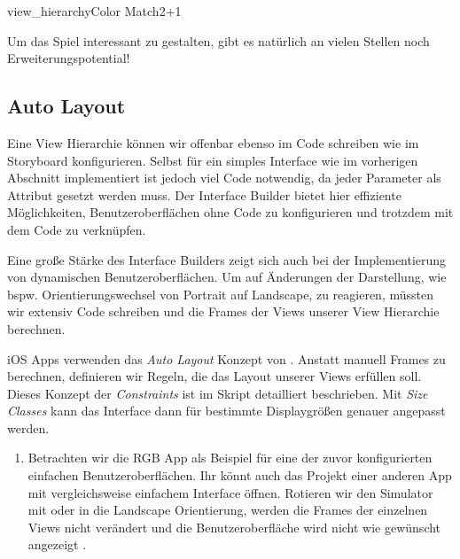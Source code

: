 \documentclass[parskip=half, final]{scrreprt}
\begin{document}
\begin{lecture}
\begin{exc}
\begin{excitem}{view_hierarchy}{Color Match}{2+1}
\begin{description}
	Um das Spiel interessant zu gestalten, gibt es natürlich an vielen Stellen noch Erweiterungspotential!

\end{description}

\end{excitem}

\end{exc}


\end{lecture}



\begin{lecture}


\section{Auto Layout}

\mvcindicatorview

Eine View Hierarchie können wir offenbar ebenso im Code schreiben wie im Storyboard konfigurieren. Selbst für ein simples Interface wie im vorherigen Abschnitt implementiert ist jedoch viel Code notwendig, da jeder Parameter als Attribut gesetzt werden muss. Der Interface Builder bietet hier effiziente Möglichkeiten, Benutzeroberflächen ohne Code zu konfigurieren und trotzdem mit dem Code zu verknüpfen.

Eine große Stärke des Interface Builders zeigt sich auch bei der Implementierung von dynamischen Benutzeroberflächen. Um auf Änderungen der Darstellung, wie bspw. Orientierungswechsel von Portrait auf Landscape, zu reagieren, müssten wir extensiv Code schreiben und die Frames der Views unserer View Hierarchie berechnen.

iOS Apps verwenden das \emph{Auto Layout} Konzept von . Anstatt manuell Frames zu berechnen, definieren wir Regeln, die das Layout unserer Views erfüllen soll. Dieses Konzept der \emph{Constraints} ist im Skript detailliert beschrieben. Mit \emph{Size Classes} kann das Interface dann für bestimmte Displaygrößen genauer angepasst werden.


\begin{enumerate}

\item Betrachten wir die RGB App als Beispiel für eine der zuvor konfigurierten einfachen Benutzeroberflächen. Ihr könnt auch das Projekt einer anderen App mit vergleichsweise einfachem Interface öffnen. Rotieren wir den Simulator mit \keys{\cmd+\arrowkeyright} oder \keys{\cmd+\arrowkeyleft} in die Landscape Orientierung, werden die Frames der einzelnen Views nicht verändert und die Benutzeroberfläche wird nicht wie gewünscht angezeigt .


\end{enumerate}
\end{lecture}
\end{document}
